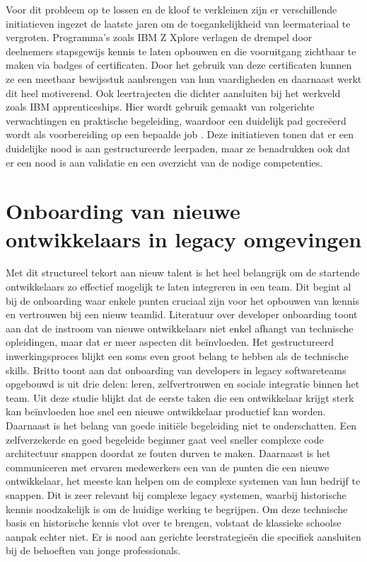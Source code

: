 Voor dit probleem op te lossen en de kloof te verkleinen zijn er verschillende initiatieven ingezet de laatste jaren om de toegankelijkheid van leermateriaal te vergroten.
Programma’s zoals IBM Z Xplore verlagen de drempel door deelnemers stapsgewijs kennis te laten opbouwen en die vooruitgang zichtbaar te maken via badges of certificaten. 
Door het gebruik van deze certificaten kunnen ze een meetbaar bewijsstuk aanbrengen van hun vaardigheden en daarnaast werkt dit heel motiverend.
Ook leertrajecten die dichter aansluiten bij het werkveld zoals IBM apprenticeships.
Hier wordt gebruik gemaakt van rolgerichte verwachtingen en praktische begeleiding, waardoor een duidelijk pad gecreëerd wordt als voorbereiding op een bepaalde job \autocite{ibm_mainframe_apprentice_2023}.
Deze initiatieven tonen dat er een duidelijke nood is aan gestructureerde leerpaden, maar ze benadrukken ook dat er een nood is aan validatie en een overzicht van de nodige competenties.

\section{Onboarding van nieuwe ontwikkelaars in legacy omgevingen }%
\label{sec:Onboarding_ontwikkelaars}

Met dit structureel tekort aan nieuw talent is het heel belangrijk om de startende ontwikkelaars zo effectief mogelijk 
te laten integreren in een team.
Dit begint al bij de onboarding waar enkele punten cruciaal zijn voor het opbouwen van kennis en vertrouwen bij een nieuw teamlid.
Literatuur over developer onboarding \autocite{Britto2017} toont aan dat de instroom van nieuwe ontwikkelaars niet enkel afhangt van technische opleidingen, maar dat er meer aspecten dit beïnvloeden.
Het gestructureerd inwerkingsproces blijkt een soms even groot belang te hebben als de technische skills.
Britto \autocite{Britto2017} toont aan dat onboarding van developers in legacy softwareteams opgebouwd is uit drie delen: 
leren, zelfvertrouwen en sociale integratie binnen het team.
Uit deze studie blijkt dat de eerste taken die een ontwikkelaar krijgt sterk kan beïnvloeden hoe snel een nieuwe ontwikkelaar productief kan worden.
Daarnaast is het belang van goede initiële begeleiding niet te onderschatten.
Een zelfverzekerde en goed begeleide beginner gaat veel sneller complexe code architectuur snappen doordat ze fouten durven te maken.
Daarnaast is het communiceren met ervaren medewerkers een van de punten die een nieuwe ontwikkelaar,
het meeste kan helpen om de complexe systemen van hun bedrijf te snappen.
Dit is zeer relevant bij complexe legacy systemen, waarbij historische kennis noodzakelijk is om de huidige werking te begrijpen.
Om deze technische basis en historische kennis vlot over te brengen, volstaat de klassieke schoolse aanpak echter niet.
Er is nood aan gerichte leerstrategieën die specifiek aansluiten bij de behoeften van jonge professionals.

